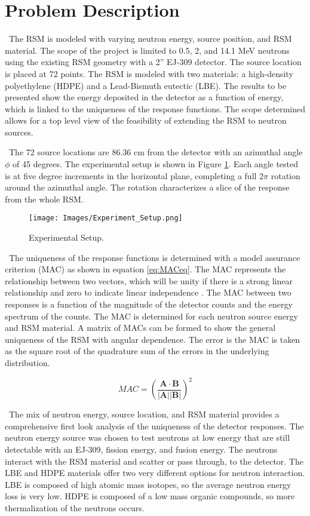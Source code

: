 \documentclass[journal]{IEEEtran}
\let\MYoriglatexcaption\caption
\renewcommand{\caption}[2][\relax]{\MYoriglatexcaption[#2]{#2}}
\begin{document}
	\section{Problem Description}
	\ The RSM is modeled with varying neutron energy, source position, and RSM material.  The scope of the project is limited to 0.5, 2, and 14.1 MeV neutrons using the existing RSM geometry with a 2'' EJ-309 detector. The source location is placed at 72 points. The RSM is modeled with two materials: a high-density polyethylene (HDPE) and a Lead-Bismuth eutectic (LBE).  The results to be presented show the energy deposited in the detector as a function of energy, which is linked to the uniqueness of the response functions.  The scope determined allows for a  top level view of the feasibility of extending the RSM to neutron sources. 
	
	\ The 72 source locations are 86.36 cm from the detector with an azimuthal angle $\phi$ of 45 degrees. The experimental setup is shown in Figure \ref{fig:3d}\cite{RSM_T}.  Each angle tested is at five degree increments in the horizontal plane, completing a full 2$\pi$ rotation around the azimuthal angle.  The rotation characterizes a slice of the response from the whole RSM. 
	
	\begin{figure}[h]
	    \texttt{[image: Images/Experiment\_Setup.png]}
	    \caption{Experimental Setup.}
	    \label{fig:3d}
    \end{figure}
	
	\ The uniqueness of the response functions is determined with a model assurance criterion (MAC) as shown in equation \ref{eq:MACeq}.  The MAC represents the relationship between two vectors, which will be unity if there is a strong linear relationship and zero to indicate linear independence \cite{RSM_T}.  The MAC between two responses is a function of the magnitude of the detector counts and the energy spectrum of the counts.  The MAC is determined for each neutron source energy and RSM material.  A matrix of MACs can be formed to show the general uniqueness of the RSM with angular dependence. The error is the MAC is taken as the square root of the quadrature sum of the errors in the underlying distribution. 
	
	\begin{equation} \label{eq:MACeq}
	MAC = (\dfrac{\mathbf{A} \cdot \mathbf{B}}{|\mathbf{A}| |\mathbf{B}|})^2  
	\end{equation}
     
    \ The mix of neutron energy, source location, and RSM material provides a comprehensive first look analysis of the uniqueness of the detector responses.  The neutron energy source was chosen to test neutrons at low energy that are still detectable with an EJ-309, fission energy, and fusion energy.  The neutrons interact with the RSM material and scatter or pass through, to the detector.  The LBE and HDPE materials offer two very different options for neutron interaction.  LBE is composed of high atomic mass isotopes, so the average neutron energy loss is very low.  HDPE is composed of a low mass organic compounds, so more thermalization of the neutrons occurs.
	
\end{document}
